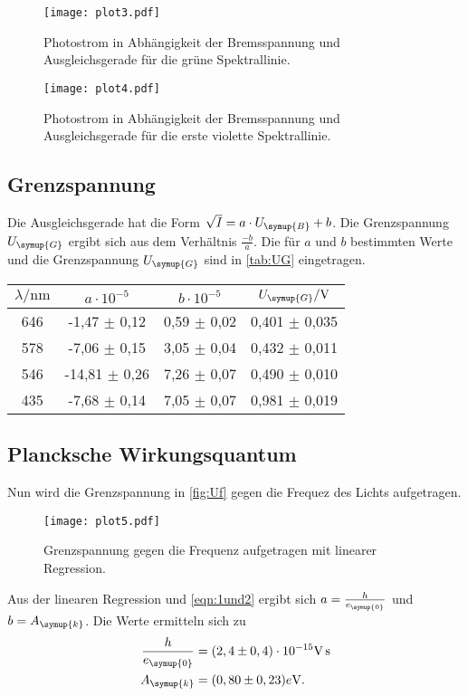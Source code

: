 \begin{figure}[!hbt]
    \centering
    \label{fig:gruen}
    \caption{Photostrom in Abhängigkeit der Bremsspannung und Ausgleichsgerade für die grüne Spektrallinie.}
    \texttt{[image: plot3.pdf]}
\end{figure}

\begin{figure}[!hbt]
    \centering
    \label{fig:violett1}
    \caption{Photostrom in Abhängigkeit der Bremsspannung und Ausgleichsgerade für die erste violette Spektrallinie.}
    \texttt{[image: plot4.pdf]}
\end{figure}

\subsection{Grenzspannung}
\label{sec:Grenzspannung}
Die Ausgleichsgerade hat die Form $\sqrt{I} = a \cdot U_{\symup{B}} + b$. Die Grenzspannung $U_{\symup{G}}$
ergibt sich aus dem Verhältnis $\frac{-b}{a}$. Die für $a$ und $b$ bestimmten Werte und die Grenzspannung
$U_{\symup{G}}$ sind in \autoref{tab:UG} eingetragen.
\begin{table}[!hbt]
    \centering
    \label{tab:UG}
    \begin{tabular}{c c c c}
        \toprule
        $\lambda/\unit{\nano\meter}$ & $a\cdot 10^{-5}$ & $b\cdot 10^{-5}$ & $U_{\symup{G}}/\unit{\volt}$\\
        \midrule
        646 &  -1,47 $\pm$ 0,12 & 0,59 $\pm$ 0,02 & 0,401 $\pm$ 0,035 \\
        578 &  -7,06 $\pm$ 0,15 & 3,05 $\pm$ 0,04 & 0,432 $\pm$ 0,011 \\
        546 & -14,81 $\pm$ 0,26 & 7,26 $\pm$ 0,07 & 0,490 $\pm$ 0,010 \\
        435 &  -7,68 $\pm$ 0,14 & 7,05 $\pm$ 0,07 & 0,981 $\pm$ 0,019 \\
        \bottomrule
    \end{tabular}
\end{table}

\subsection{Plancksche Wirkungsquantum}
\label{sec:Plancksche_Wirkungsquantum}
Nun wird die Grenzspannung in \autoref{fig:Uf} gegen die Frequez des Lichts aufgetragen.
\begin{figure}[!hbt]
    \centering
    \caption{Grenzspannung gegen die Frequenz aufgetragen mit linearer Regression.}
    \label{fig:Uf}
    \texttt{[image: plot5.pdf]}
\end{figure}
Aus der linearen Regression und \autoref{eqn:1und2} ergibt sich $a=\frac{h}{e_{\symup{0}}}$ und
$b=A_{\symup{k}}$. Die Werte ermitteln sich zu
\begin{align*}
    \frac{h}{e_{\symup{0}}}&= (2,4 \pm 0,4)\cdot 10^{-15}\unit{\volt\second}\\
    A_{\symup{k}} &= (0,80 \pm 0,23) e\unit{\volt}.\\
\end{align*}

